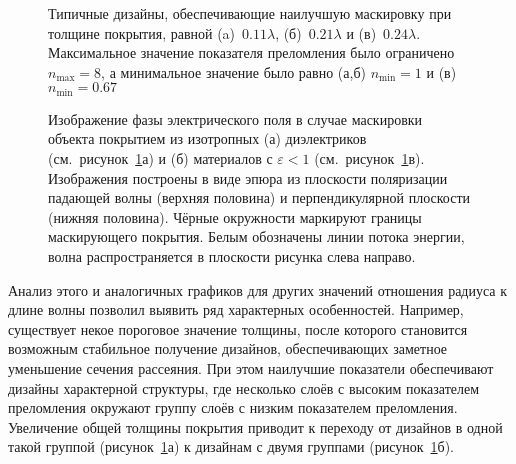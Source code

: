 \begin{figure}[p]
  \begin{minipage}[ht]{0.32\linewidth}
  \end{minipage}
  \hfill
  \begin{minipage}[ht]{0.32\linewidth}
  \end{minipage}
  \hfill
  \begin{minipage}[ht]{0.32\linewidth}
  \end{minipage}
  \caption{Типичные дизайны, обеспечивающие наилучшую маскировку при
    толщине покрытия, равной (a)~$0.11\lambda$, (б)~$0.21\lambda$ и
    (в)~$0.24\lambda$. Максимальное значение показателя преломления
    было ограничено $n_{\mathrm{max}}=8$, а минимальное значение
    было равно (а,б) $n_{\mathrm{min}}=1$ и (в) $n_{\mathrm{min}}=0.67$
  }
  \label{img:designs}  
\end{figure}
\begin{figure}[p]
  \begin{minipage}[ht]{0.495\linewidth}
  \end{minipage}
  \hfill
  \begin{minipage}[ht]{0.495\linewidth}
  \end{minipage}
  \caption{Изображение фазы электрического поля в случае маскировки
    объекта покрытием из изотропных (а) диэлектриков
    (см.~рисунок~\ref{img:designs}а) и (б) материалов с
    ${\varepsilon <1}$ (см.~рисунок~\ref{img:designs}в). Изображения
    построены в виде эпюра из плоскости поляризации падающей волны
    (верхняя половина) и перпендикулярной плоскости (нижняя
    половина). Чёрные окружности маркируют границы маскирующего
    покрытия. Белым обозначены линии потока энергии, волна
    распространяется в плоскости рисунка слева направо.}
  \label{img:field-phase}  
\end{figure}

Анализ этого и аналогичных графиков для других значений отношения
радиуса к длине волны позволил выявить ряд характерных
особенностей. Например, существует некое пороговое значение толщины,
после которого становится возможным стабильное получение дизайнов,
обеспечивающих заметное уменьшение сечения рассеяния. При этом
наилучшие показатели обеспечивают дизайны характерной структуры, где
несколько слоёв с высоким показателем преломления окружают группу
слоёв с низким показателем преломления. Увеличение общей толщины
покрытия приводит к переходу от дизайнов в одной такой группой
(рисунок~\ref{img:designs}а) к дизайнам с двумя группами
(рисунок~\ref{img:designs}б).

